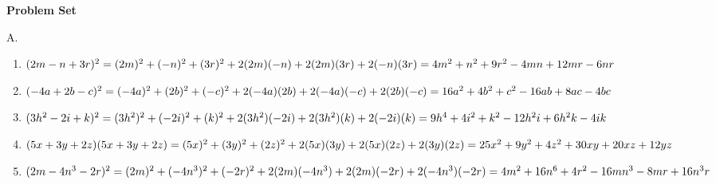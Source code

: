 \textbf{Problem Set}

\vspce

A.   
\begin{enumerate}
\item \hspce $(2m - n + 3r)^{2} 
= (2m)^{2}+(- n)^{2}+(3r)^{2}+2(2m)(- n)+2(2m)(3r)\\+2(- n)(3r)\\
=4m^2+n^2+9r^2-4mn+12mr-6nr$ 
\item \hspce $(-4a + 2b - c)^{2}
= (-4a)^{2}+(2b)^{2}+(- c)^{2}+2(-4a)(2b)\\+2(-4a)(- c)+2(2b)(- c)\\
=16a^2+4b^2+c^2-16ab+8ac-4bc$
\item \hspce $(3h^{2} - 2i + k)^{2}
= (3h^{2})^{2}+(- 2i)^{2}+(k)^{2}+2(3h^{2})(- 2i)+2(3h^{2})(k)\\+2(- 2i)(k)\\
=9h^4+4i^2+k^2-12h^2i+6h^2k-4ik$
\item \hspce $(5x + 3y + 2z)(5x + 3y + 2z)
= (5x)^{2}+(3y)^{2}+(2z)^{2}+2(5x)(3y)\\+2(5x)(2z)+2(3y)(2z)\\
=25x^2+9y^2+4z^2+30xy+20xz+12yz$
\item \hspce $(2m - 4n^{3} - 2r)^{2}
= (2m)^{2}+(- 4n^{3})^{2}+(- 2r)^{2}+2(2m)(- 4n^{3})+2(2m)(- 2r)+2(- 4n^{3})(- 2r)\\
=4m^2+16n^6+4r^2-16mn^3-8mr+16n^3r$
\end{enumerate}

